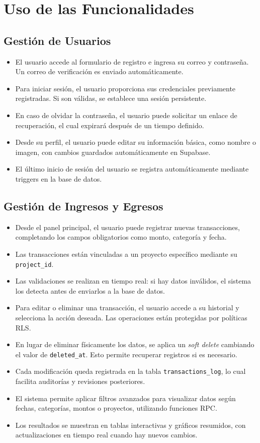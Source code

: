 \section{Uso de las Funcionalidades}

\subsection*{Gestión de Usuarios}
\begin{itemize}
    \item El usuario accede al formulario de registro e ingresa su correo y contraseña. Un correo de verificación es enviado automáticamente.
    \item Para iniciar sesión, el usuario proporciona sus credenciales previamente registradas. Si son válidas, se establece una sesión persistente.
    \item En caso de olvidar la contraseña, el usuario puede solicitar un enlace de recuperación, el cual expirará después de un tiempo definido.
    \item Desde su perfil, el usuario puede editar su información básica, como nombre o imagen, con cambios guardados automáticamente en Supabase.
    \item El último inicio de sesión del usuario se registra automáticamente mediante triggers en la base de datos.
\end{itemize}

\subsection*{Gestión de Ingresos y Egresos}
\begin{itemize}
    \item Desde el panel principal, el usuario puede registrar nuevas transacciones, completando los campos obligatorios como monto, categoría y fecha.
    \item Las transacciones están vinculadas a un proyecto específico mediante su \texttt{project\_id}.
    \item Las validaciones se realizan en tiempo real: si hay datos inválidos, el sistema los detecta antes de enviarlos a la base de datos.
    \item Para editar o eliminar una transacción, el usuario accede a su historial y selecciona la acción deseada. Las operaciones están protegidas por políticas RLS.
    \item En lugar de eliminar físicamente los datos, se aplica un \textit{soft delete} cambiando el valor de \texttt{deleted\_at}. Esto permite recuperar registros si es necesario.
    \item Cada modificación queda registrada en la tabla \texttt{transactions\_log}, lo cual facilita auditorías y revisiones posteriores.
    \item El sistema permite aplicar filtros avanzados para visualizar datos según fechas, categorías, montos o proyectos, utilizando funciones RPC.
    \item Los resultados se muestran en tablas interactivas y gráficos resumidos, con actualizaciones en tiempo real cuando hay nuevos cambios.
\end{itemize}

